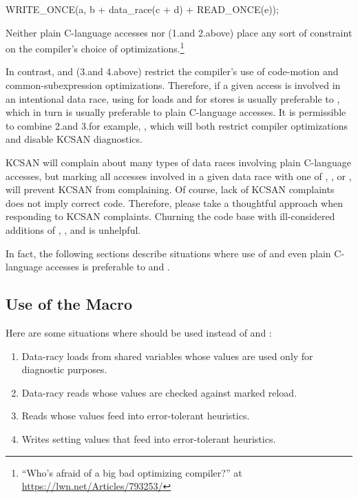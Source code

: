 \begin{VerbatimU}
	WRITE_ONCE(a, b + data_race(c + d) + READ_ONCE(e));
\end{VerbatimU}

Neither plain C-language accesses nor  (1.\@ and 2.\@ above) place
any sort of constraint on the compiler's choice of optimizations.\footnote{
``Who's afraid of a big bad optimizing compiler?'' at
\url{https://lwn.net/Articles/793253/}
}

In contrast,  and  (3.\@ and 4.\@ above) restrict the
compiler's use of code-motion and common-subexpression optimizations.
Therefore, if a given access is involved in an intentional data race,
using  for loads and  for stores is usually
preferable to , which in turn is usually preferable to plain
C-language accesses.
It is permissible to combine 2.\@ and 3.\@ for example,
, which will both restrict compiler optimizations
and disable KCSAN diagnostics.

KCSAN will complain about many types of data races involving plain
C-language accesses, but marking all accesses involved in a given data
race with one of , , or ,
will prevent KCSAN from complaining.
Of course, lack of KCSAN complaints does not imply correct code.
Therefore, please take a thoughtful approach when responding to KCSAN
complaints.
Churning the code base with ill-considered additions of ,
, and  is unhelpful.

In fact, the following sections describe situations where use of
 and even plain C-language accesses is preferable to
 and .


\subsection{Use of the  Macro}

Here are some situations where  should be used instead of
 and :

\begin{enumerate}
\item	Data-racy loads from shared variables whose values are used only
	for diagnostic purposes.

\item	Data-racy reads whose values are checked against marked reload.

\item	Reads whose values feed into error-tolerant heuristics.

\item	Writes setting values that feed into error-tolerant heuristics.
\end{enumerate}

